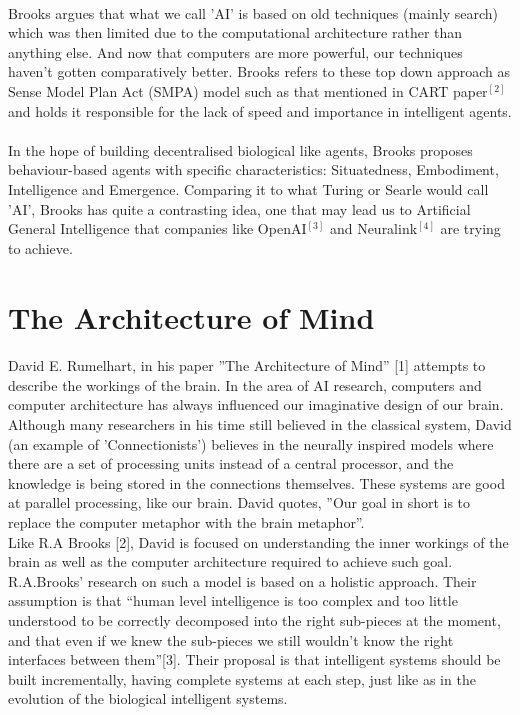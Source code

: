 \documentclass[10pt]{article}
\begin{document}
  \paragraph{}\indent
  Brooks argues that what we call 'AI' is based on old techniques (mainly search) which was then limited due to the computational architecture rather than anything else. And now that computers are more powerful, our techniques haven't gotten comparatively better.  Brooks refers to these top down approach as Sense Model Plan Act (SMPA) model such as that mentioned in CART paper$^{[2]}$ and holds it responsible for the lack of speed and importance in intelligent agents. 
  \paragraph{}\indent
  In the hope of building decentralised biological like agents, Brooks proposes behaviour-based agents with specific characteristics: Situatedness, Embodiment, Intelligence and Emergence. Comparing it to what Turing or Searle would call 'AI', Brooks has quite a contrasting idea, one that may lead us to Artificial General Intelligence that companies like OpenAI$^{[3]}$ and Neuralink$^{[4]}$ are trying to achieve. 

  \section{The Architecture of Mind}
  \paragraph{}\indent
  David E. Rumelhart, in his paper ”The Architecture of Mind” [1] attempts to describe the workings of the brain. In the area of AI research, computers and computer architecture has always influenced our imaginative design of our brain. Although many researchers in his time still believed in the classical system, David (an example of ’Connectionists’) believes in the neurally inspired models where there are a set of processing units instead of a central processor, and the knowledge is being stored in the connections themselves. These systems are good at parallel processing, like our brain. David quotes, ”Our goal in short is to replace the computer metaphor with the brain metaphor”. \\

  Like R.A Brooks [2], David is focused on understanding the inner workings of the brain as well as the computer architecture required to achieve such goal. R.A.Brooks’ research on such a model is based on a holistic approach. Their assumption is that “human level intelligence is too complex and too little understood to be correctly decomposed into the right sub-pieces at the moment, and that even if we knew the sub-pieces we still wouldn’t know the right interfaces between them”[3]. Their proposal is that intelligent systems should be built incrementally, having complete systems at each step, just like as in the evolution of the biological intelligent systems. \\ 
\end{document}
